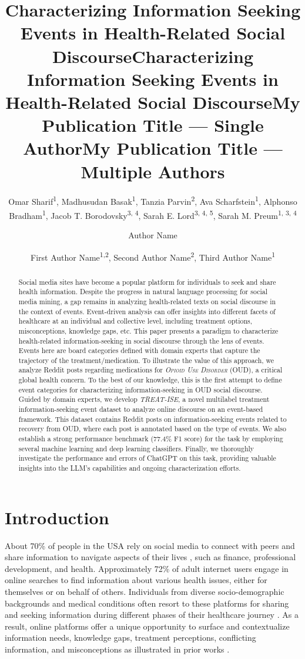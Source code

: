 \documentclass[letterpaper]{article}
\title{Characterizing Information Seeking Events in Health-Related Social Discourse}
\title{Characterizing Information Seeking Events in Health-Related Social Discourse}
\author {
    Omar Sharif\textsuperscript{\rm 1},
    Madhusudan Basak\textsuperscript{\rm1},
    Tanzia Parvin\textsuperscript{\rm 2},
    Ava Scharfstein\textsuperscript{\rm 1},
    Alphonso Bradham\textsuperscript{\rm 1},
    Jacob T. Borodovsky\textsuperscript{\rm 3, \rm 4},
    Sarah E. Lord\textsuperscript{\rm 3, \rm 4, \rm 5},
    Sarah M. Preum\textsuperscript{\rm 1, \rm 3, \rm 4}
}
\title{My Publication Title --- Single Author}
\author {
    Author Name
}
\title{My Publication Title --- Multiple Authors}
\author {
    First Author Name\textsuperscript{\rm 1,\rm 2},
    Second Author Name\textsuperscript{\rm 2},
    Third Author Name\textsuperscript{\rm 1}
}
\begin{document}
\maketitle

\begin{abstract}
Social media sites have become a popular platform for individuals to seek and share health information. Despite the progress in natural language processing for social media mining, a gap remains in analyzing health-related texts on social discourse in the context of events. Event-driven analysis can offer insights into different facets of healthcare at an individual and collective level, including treatment options, misconceptions, knowledge gaps, etc. This paper presents a paradigm to characterize health-related information-seeking in social discourse through the lens of events. Events here are board categories defined with domain experts that capture the trajectory of the treatment/medication. To illustrate the value of this approach, we analyze Reddit posts regarding medications for \textit{\textsc{Opioid Use Disorder}} (OUD), a critical global health concern. To the best of our knowledge, this is the first attempt to define event categories for characterizing information-seeking in OUD social discourse. Guided by domain experts, we develop \textit{TREAT-ISE}, a novel multilabel treatment information-seeking event dataset to analyze online discourse on an event-based framework. This dataset contains Reddit posts on information-seeking events related to recovery from OUD, where each post is annotated based on the type of events. We also establish a strong performance benchmark (77.4\% F1 score) for the task by employing several machine learning and deep learning classifiers. Finally, we thoroughly investigate the performance and errors of ChatGPT on this task, providing valuable insights into the LLM's capabilities and ongoing characterization efforts.
\end{abstract}

\section{Introduction}

About 70\% of people in the USA rely on social media to connect with peers and share information to navigate aspects of their lives \cite{kanchan2023social}, such as finance, professional development, and health. Approximately 72\% of adult internet users engage in online searches to find information about various health issues, either for themselves or on behalf of others. Individuals from diverse socio-demographic backgrounds and medical conditions often resort to these platforms for sharing and seeking information during different phases of their healthcare journey \cite{Neely2021-ji}. As a result, online platforms offer a unique opportunity to surface and contextualize information needs, knowledge gaps, treatment perceptions, conflicting information, and misconceptions as illustrated in prior works \cite{EDOOSAGIE2020103770,chen2021social,gatto2023scope, acm_review}.
\end{document}
